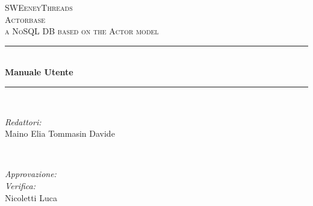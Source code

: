 \documentclass[a4paper]{article}
\begin{document}
	
	\begin{titlepage}
		\newcommand{\HRule}{\rule{\linewidth}{0.5mm}} 
		\center  
		
		\textsc{\LARGE SWEeneyThreads}\\[1.5cm] 
		\textsc{\Large Actorbase}\\[0.5cm] 
		\textsc{\large a NoSQL DB based on the Actor model}\\[0.5cm]
		
		
		\HRule \\[0.4cm]
		{ \huge \bfseries Manuale Utente}\\[0.4cm] 
		\HRule \\[1.5cm]
		
		\begin{minipage}{0.4\textwidth}
			\begin{flushleft} \large
				\emph{Redattori:}\\
				Maino Elia \newline
				Tommasin Davide \\
			\end{flushleft}
		\end{minipage}
		~
		\begin{minipage}{0.4\textwidth}
			\begin{flushright} \large
				\emph{Approvazione:} \\
				\emph{Verifica:} \\
				Nicoletti Luca
			\end{flushright}
		\end{minipage}
		

\end{titlepage}
\end{document}
